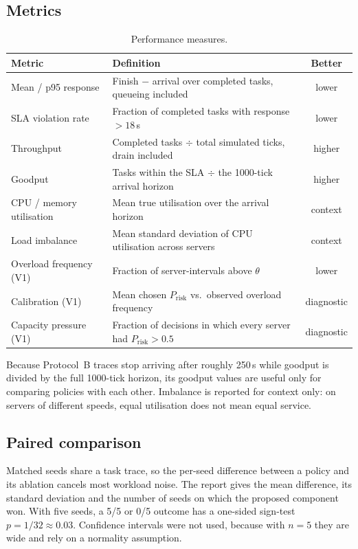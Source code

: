 \documentclass[11pt,a4paper]{article}
\newcommand{\prisk}{P_{\mathrm{risk}}}
\begin{document}
\subsection{Metrics}
\begin{table}[H]
\caption{Performance measures.}\label{tab:metrics}
\begin{tabularx}{\linewidth}{lYc}
\toprule
\textbf{Metric} & \textbf{Definition} & \textbf{Better}\\
\midrule
Mean / p95 response & Finish $-$ arrival over completed tasks, queueing included & lower\\
SLA violation rate & Fraction of completed tasks with response $>18$\,s & lower\\
Throughput & Completed tasks $\div$ total simulated ticks, drain included & higher\\
Goodput & Tasks within the SLA $\div$ the 1000-tick arrival horizon & higher\\
CPU / memory utilisation & Mean true utilisation over the arrival horizon & context\\
Load imbalance & Mean standard deviation of CPU utilisation across servers & context\\
Overload frequency (V1) & Fraction of server-intervals above $\theta$ & lower\\
Calibration (V1) & Mean chosen $\prisk$ vs.\ observed overload frequency & diagnostic\\
Capacity pressure (V1) & Fraction of decisions in which every server had $\prisk>0.5$ & diagnostic\\
\bottomrule
\end{tabularx}
\end{table}

Because Protocol~B traces stop arriving after roughly 250\,s while goodput is divided by the full 1000-tick
horizon, its goodput values are useful only for comparing policies with each other. Imbalance is reported for
context only: on servers of different speeds, equal utilisation does not mean equal service.

\subsection{Paired comparison}
Matched seeds share a task trace, so the per-seed difference between a policy and its ablation cancels most
workload noise. The report gives the mean difference, its standard deviation and the number of seeds on which
the proposed component won. With five seeds, a 5/5 or 0/5 outcome has a one-sided sign-test $p=1/32\approx0.03$.
Confidence intervals were not used, because with $n=5$ they are wide and rely on a normality assumption.
\end{document}
